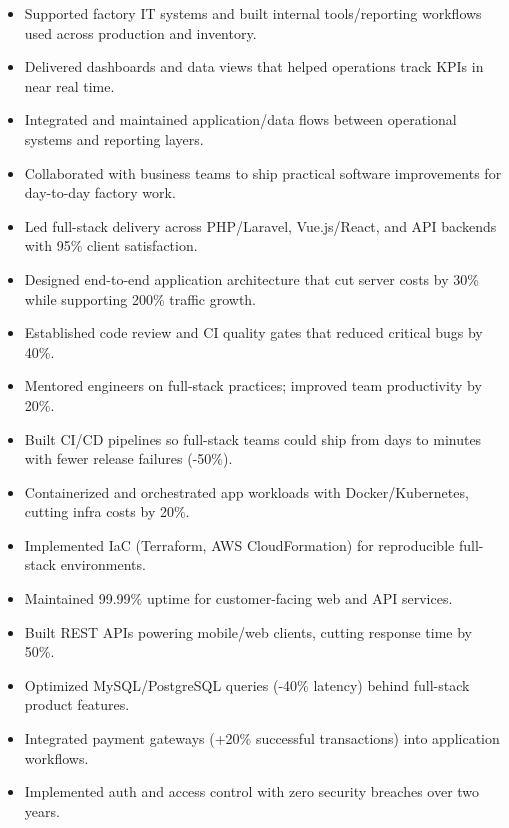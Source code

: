 
\begin{itemize}
\item Supported factory IT systems and built internal tools/reporting workflows used across production and inventory.
\item Delivered dashboards and data views that helped operations track KPIs in near real time.
\item Integrated and maintained application/data flows between operational systems and reporting layers.
\item Collaborated with business teams to ship practical software improvements for day-to-day factory work.
\end{itemize}
\divider

\begin{itemize}
\item Led full-stack delivery across PHP/Laravel, Vue.js/React, and API backends with 95\% client satisfaction.
\item Designed end-to-end application architecture that cut server costs by 30\% while supporting 200\% traffic growth.
\item Established code review and CI quality gates that reduced critical bugs by 40\%.
\item Mentored engineers on full-stack practices; improved team productivity by 20\%.
\end{itemize}
\divider

\begin{itemize}
\item Built CI/CD pipelines so full-stack teams could ship from days to minutes with fewer release failures (-50\%).
\item Containerized and orchestrated app workloads with Docker/Kubernetes, cutting infra costs by 20\%.
\item Implemented IaC (Terraform, AWS CloudFormation) for reproducible full-stack environments.
\item Maintained 99.99\% uptime for customer-facing web and API services.
\end{itemize}
\divider

\begin{itemize}
\item Built REST APIs powering mobile/web clients, cutting response time by 50\%.
\item Optimized MySQL/PostgreSQL queries (-40\% latency) behind full-stack product features.
\item Integrated payment gateways (+20\% successful transactions) into application workflows.
\item Implemented auth and access control with zero security breaches over two years.
\end{itemize}
\divider

